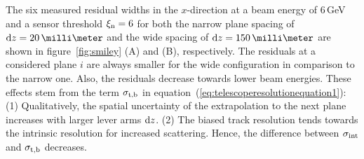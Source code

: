 The six measured residual widths in the $x$-direction at a beam energy of 6\,GeV and a sensor threshold $\xi_{\textrm{n}} = 6$ for both the narrow plane spacing of $\dz = 20\,\milli\meter$ and the wide spacing of $\dz = 150\,\milli\meter$ are shown in figure~\ref{fig:smiley} (A) and (B), respectively. 
The residuals at a considered plane $i$ are always smaller for the wide configuration in comparison to the narrow one. 
Also, the residuals decrease towards lower beam energies. 
These effects stem from the term $\sigma_{\textrm{t,b}}$ in equation~(\ref{eq:telescoperesolutionequation1}): 
(1) Qualitatively, the spatial uncertainty of the extrapolation to the next plane increases with larger lever arms $\textrm{d}z$. 
(2) The biased track resolution tends towards the intrinsic resolution for increased scattering. 
Hence, the difference between $\sigma_{\textrm{int}}$ and $\sigma_{\textrm{t,b}}$ decreases. 


%


